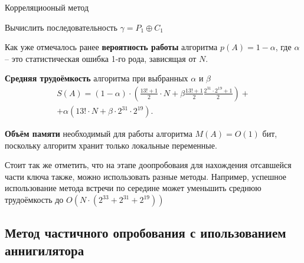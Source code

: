 \documentclass[a4paper,12pt]{article}
\theoremstyle{definition}
\begin{document}
	\begin{algorithm}[H]
		
		\caption{Корреляциооный метод}
		\label{alg:Corr}
		\SetAlgoNoEnd
		
		
		Вычислить последовательность $\gamma = P_1 \oplus C_1$
		
	\end{algorithm}	
	
	Как уже отмечалось ранее \textbf{вероятность работы} алгоритма $p(A)=1-\alpha$, где $\alpha$ -- это статистическая ошибка 1-го рода, зависящая от $N$. 
	
	\textbf{Средняя трудоёмкость} алгоритма при выбранных $\alpha$ и $\beta$ 
	\begin{multline*}	
	S(A)=\left( 1-\alpha \right)\cdot \left( \frac{13! + 1}{2} \cdot N + \beta \frac{13! + 1}{2} \frac{2^{31} \cdot 2^{19} + 1}{2} \right) + \\ + \alpha \left( 13! \cdot N + \beta \cdot 2^{31} \cdot 2^{19}  \right).
	\end{multline*}		

	\textbf{Объём памяти} необходимый для работы алгоритма $M(A) = O(1)$ бит, поскольку алгоритм хранит только локальные переменные.
	
	Стоит так же отметить, что на этапе доопробоваия для нахождения отсавшейся части ключа также, можно использовать разные методы. Например, успешное использование метода встречи по середине может уменьшить среднюю трудоёмкость до $O\left(N\cdot\left( 2^{33} + 2^{31} + 2^{19} \right) \right)$
	
	\subsection{Метод частичного опробования с ипользованием аннигилятора}
	
\end{document}
